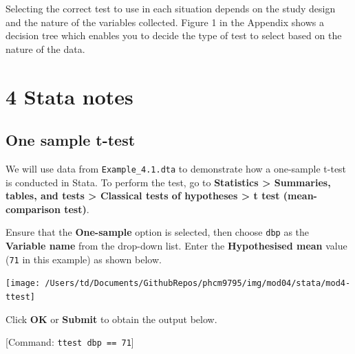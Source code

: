 \documentclass[
]{memoir}
\begin{document}
Selecting the correct test to use in each situation depends on the study design and the nature of the variables collected. Figure 1 in the Appendix shows a decision tree which enables you to decide the type of test to select based on the nature of the data.

\hypertarget{stata-notes-2}{%
\chapter*{\texorpdfstring{\textbf{4} Stata notes}{4 Stata notes}}\label{stata-notes-2}}

\hypertarget{one-sample-t-test-1}{%
\section{One sample t-test}\label{one-sample-t-test-1}}

We will use data from \texttt{Example\_4.1.dta} to demonstrate how a one-sample t-test is conducted in Stata. To perform the test, go to \textbf{Statistics \textgreater{} Summaries, tables, and tests \textgreater{} Classical tests of hypotheses \textgreater{} t test (mean-comparison test)}.

Ensure that the \textbf{One-sample} option is selected, then choose \texttt{dbp} as the \textbf{Variable name} from the drop-down list. Enter the \textbf{Hypothesised mean} value (\texttt{71} in this example) as shown below.

\texttt{[image: /Users/td/Documents/GithubRepos/phcm9795/img/mod04/stata/mod4-ttest]}

Click \textbf{OK} or \textbf{Submit} to obtain the output below.

{[}Command: \texttt{ttest\ dbp\ ==\ 71}{]}
\end{document}

